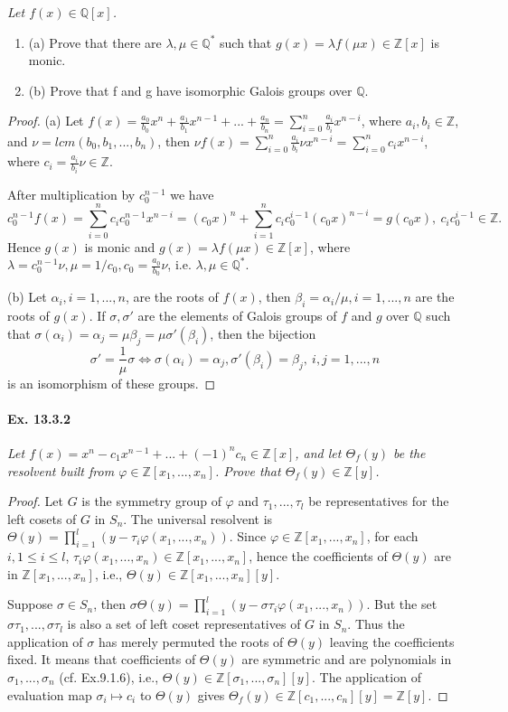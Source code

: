 \documentclass[11pt,a4paper]{article}
\newcommand{\be} {\begin{enumerate}}
\newcommand{\ee} {\end{enumerate}}
\newcommand{\Q}{\mathbb{Q}}
\newcommand{\Z}{\mathbb{Z}}
\begin{document}
{\it Let $f(x) \in \Q[x]$.
\be
\item[(a)] Prove that there are $\lambda, \mu \in \Q^*$ such that $g(x)=\lambda f(\mu x)\in\Z[x]$ is monic.
\item[(b)] Prove that f and g have isomorphic Galois groups over $\Q$.
\ee
\begin{proof}
\item[(a)] Let $f(x)=\frac {a_0}{b_0}x^n+\frac {a_1}{b_1}x^{n-1}+...+\frac {a_n}{b_n}=\sum_{i=0}^n \frac {a_i}{b_i}x^{n-i}$, where $a_i,b_i \in \Z$, and $\nu=lcm(b_0,b_1,...,b_n)$, then $\nu f(x)=\sum_{i=0}^n \frac {a_i}{b_i}\nu x^{n-i}=\sum_{i=0}^n c_i x^{n-i}$, where $c_i=\frac {a_i}{b_i}\nu \in \Z$.

After multiplication by $c_0^{n-1}$ we have $$c_0^{n-1}f(x)=\sum_{i=0}^n c_i c_0^{n-1} x^{n-i}=(c_0 x)^n+\sum_{i=1}^n c_i c_0^{i-1} (c_0 x)^{n-i}=g(c_0 x), ~ c_i c_0^{i-1} \in \Z.$$ Hence $g(x)$ is monic   and $g(x)=\lambda f(\mu x)\in\Z[x]$, where $\lambda=c_0^{n-1}\nu,\mu=1/c_0, c_0=\frac{a_0}{b_0} \nu$, i.e. $\lambda,\mu \in \Q^*$.


\item[(b)] Let $\alpha_i, i=1,...,n$, are the roots of $f(x)$, then $\beta_i=\alpha_i/\mu, i=1,...,n$ are the roots of $g(x)$. If $\sigma,\sigma'$ are the elements of Galois groups of $f$ and $g$ over $\Q$ such that $\sigma(\alpha_i)=\alpha_j=\mu\beta_j=\mu\sigma'(\beta_i)$, then the bijection $$\sigma'=\frac{1}{\mu}\sigma \iff  \sigma(\alpha_i)=\alpha_j,\sigma'(\beta_i)=\beta_j,~i,j=1,...,n $$  is an isomorphism of these groups.  
\end{proof}
}

\paragraph{Ex. 13.3.2}

{\it Let $f(x)=x^n-c_1x^{n-1}+...+(-1)^n c_n \in \Z[x]$, and let $\Theta_f(y)$ be the resolvent built from $\varphi \in \Z [x_1,...,x_n]$. Prove that $\Theta_f(y) \in \Z[y]$.

\begin{proof}
Let $G$ is the symmetry group of $\varphi$ and $\tau_1,...,\tau_l$ be representatives for the left cosets of $G$ in $S_n$. The universal resolvent is $\Theta(y)=\prod_{i=1}^l ( y - \tau_i\varphi(x_1,...,x_n))$. Since $\varphi \in \Z [x_1,...,x_n]$, for each $i, 1\leq i \leq l$, $\tau_i\varphi(x_1,...,x_n)\in \Z [x_1,...,x_n]  $, hence the coefficients of $\Theta(y)$ are in $\Z [x_1,...,x_n]  $, i.e., $\Theta(y)\in \Z [x_1,...,x_n][y]  $.

Suppose $\sigma \in S_n$, then $\sigma\Theta(y)=\prod_{i=1}^l ( y - \sigma\tau_i\varphi(x_1,...,x_n))$. But the set $\sigma\tau_1,...,\sigma\tau_l$ is also a set of left coset representatives of $G$ in $S_n$. Thus the application of $\sigma$ has merely permuted the roots of $\Theta(y)$ leaving the coefficients fixed. It means that coefficients of $\Theta(y)$ are symmetric and are polynomials in $\sigma_1,...,\sigma_n$ (cf. Ex.9.1.6), i.e., $\Theta(y)\in \Z [\sigma_1,...,\sigma_n][y]  $.
The application of evaluation map $\sigma_i \mapsto c_i$ to $\Theta(y)$ gives $\Theta_f(y) \in \Z [c_1,...,c_n][y] = \Z[y]$.
\end{proof}
}
\end{document}

